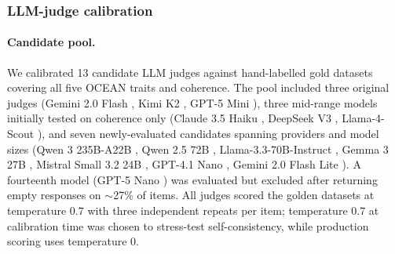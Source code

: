 \subsubsection{LLM-judge calibration}\label{sec:appendix-e-judges}


\paragraph{Candidate pool.}
We calibrated 13 candidate LLM judges against hand-labelled gold datasets covering all five OCEAN traits and coherence. The pool included three original judges (Gemini 2.0 Flash \citep{google2025gemini20flash}, Kimi K2 \citep{moonshot2024kimik2}, GPT-5 Mini \citep{openai2025gpt5}), three mid-range models initially tested on coherence only (Claude 3.5 Haiku \citep{anthropic2024claude35haiku}, DeepSeek V3 \citep{deepseek2024v3}, Llama-4-Scout \citep{meta2025llama4scout}), and seven newly-evaluated candidates spanning providers and model sizes (Qwen 3 235B-A22B \citep{qwen2025qwen3}, Qwen 2.5 72B \citep{qwen2024qwen25}, Llama-3.3-70B-Instruct \citep{meta2024llama33}, Gemma 3 27B \citep{gemma_2025}, Mistral Small 3.2 24B \citep{mistral2025small32}, GPT-4.1 Nano \citep{openai2025gpt41}, Gemini 2.0 Flash Lite \citep{google2025gemini20flash}). A fourteenth model (GPT-5 Nano \citep{openai2025gpt5}) was evaluated but excluded after returning empty responses on $\sim$27\% of items. All judges scored the golden datasets at temperature $0.7$ with three independent repeats per item; temperature $0.7$ at calibration time was chosen to stress-test self-consistency, while production scoring uses temperature $0$.

